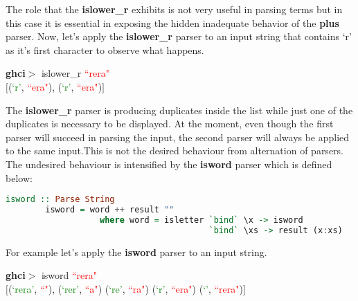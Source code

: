 \documentclass[a4paper, onecolumn]{article}
\begin{document}
    \noindent The role that the \textbf{islower\_r} exhibits is not very useful in parsing terms but in this case it is essential in exposing the hidden inadequate behavior of the \textbf{plus} parser. Now, let's apply the \textbf{islower\_r} parser to an input string that contains `r' as it's first character to observe what happens.
    
    \begin{center}
            \textbf{ghci$>$} islower\_r \textcolor{red}{``rera"} \\
            $\big[$(\textcolor{green}{`r'}, \textcolor{red}{``era"}), (\textcolor{green}{`r'}, \textcolor{red}{``era"})$\big]$
        \end{center}
    
     \noindent The \textbf{islower\_r} parser is producing duplicates inside the list while just one of the duplicates is necessary to be displayed. At the moment, even though the first parser will succeed in parsing the input, the second parser will always be applied to the same input.This is not the desired behaviour from alternation of parsers. The undesired behaviour is intensified by the \textbf{isword} parser which is defined below:
     
    \begin{tcolorbox}
    \begin{lstlisting}[language=Haskell] 
        isword :: Parse String
        isword = word ++ result ""
                   where word = isletter `bind` \x -> isword 
                                         `bind` \xs -> result (x:xs)
    \end{lstlisting}
    \end{tcolorbox}
    
    \noindent For example let's apply the \textbf{isword} parser to an input string.
    
    \begin{center}
            \textbf{ghci$>$} isword \textcolor{red}{``rera"} \\
               $\big[$(\textcolor{green}{`rera'}, \textcolor{red}{``"}), (\textcolor{green}{`rer'}, \textcolor{red}{``a"})
            (\textcolor{green}{`re'}, \textcolor{red}{``ra"})
            (\textcolor{green}{`r'}, \textcolor{red}{``era"})
            (\textcolor{green}{`'}, \textcolor{red}{``rera"})$\big]$
        \end{center}
        
\end{document}
